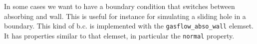 

In some cases we want to have a boundary condition that switches
between absorbing and wall. This is useful for instance for simulating
a sliding hole in a boundary. This kind of b.c. is implemented with
the \verb+gasflow_abso_wall+ elemset. It has properties similar to
that elemset, in particular the \verb+normal+ property. 


